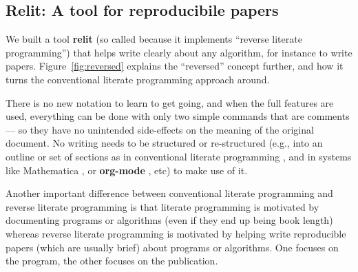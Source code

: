 \documentclass[preprint,times]{elsarticle}
\def\new#1{#1}
\def\name#1{\textbf{#1}}
\begin{document}
\subsection{Relit: A tool for reproducibile papers}
We built a tool \name{relit} (so called because it implements ``reverse literate programming'') that helps write clearly about any algorithm\new{, for instance to write papers}. Figure~\ref{fig:reversed} explains the ``reversed'' concept further\new{, and how it turns the conventional literate programming approach around.}

\new{There is no new notation to learn to get going, and when the full features are used, everything can be done with only two simple commands that are comments --- so they have no unintended side-effects on the meaning of the original document. No writing needs to be structured or re-structured (e.g., into an outline or set of sections as in conventional literate programming  \cite{litprog,noweb}, and in systems like  Mathematica \cite{mathematica}, or \name{org-mode} \cite{org-mode}, etc) to make use of it.}

\new{Another important difference between conventional literate programming and reverse literate programming is that literate programming is motivated by documenting programs or algorithms (even if they end up being book length) whereas reverse literate programming is motivated by helping write reproducible papers (which are usually brief) about programs or algorithms. One focuses on the program, the other focuses on the publication.}
\end{document}
